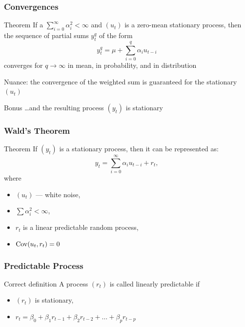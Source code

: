 \begin{frame}
	\frametitle{Convergences}
	\begin{block}{Theorem}
		If a
		$\sum_{i=0}^{\infty} \alpha_i^2 < \infty$ and $(u_t)$ is a zero-mean stationary process,
		then the sequence of partial sums $y^q_t$ of the form
		\[
		y^q_t = \mu + \sum_{i=0}^q \alpha_i u_{t-i}
		\]
		converges for $q \to \infty$ \alert{in mean}, \alert{in probability}, and \alert{in distribution}
	\end{block}
	
	Nuance: the convergence of the weighted sum is guaranteed for the stationary $(u_t)$
	\pause
	\begin{block}{Bonus}
		\ldots and the resulting process $(y_t)$ is stationary
	\end{block}
\end{frame}



\begin{frame}
	\frametitle{Wald's Theorem}
	
	\begin{block}{Theorem}
		If $(y_t)$ is a stationary process, then it can be represented as:
		\[
		y_t = \sum_{i=0}^{\infty} \alpha_i u_{t-i} + r_t,
		\]
		where
		\begin{itemize}
			\item $(u_t)$ — white noise,
			\item $\sum \alpha_i^2 < \infty$,
			\item $r_t$ is a linear \alert{predictable} random process,
			\item $\operatorname{Cov}(u_t, r_t) = 0$
		\end{itemize}
	\end{block}
	
	
\end{frame}

\begin{frame}
	\frametitle{Predictable Process}
	
	
	\begin{block}{Correct definition}
		A process $(r_t)$ is called \alert{linearly predictable} if
		\begin{itemize}
			\item $(r_t)$ is stationary,
			\item $r_t = \beta_0 + \beta_1 r_{t-1} + \beta_2 r_{t-2} + \ldots + \beta_p r_{t-p}$
		\end{itemize}
		
	\end{block}
	
\end{frame}




